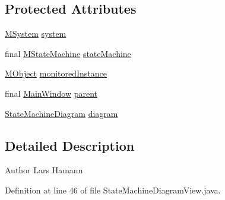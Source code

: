 \subsection*{Protected Attributes}
\begin{DoxyCompactItemize}
\item 
\hyperlink{classorg_1_1tzi_1_1use_1_1uml_1_1sys_1_1_m_system}{M\-System} \hyperlink{classorg_1_1tzi_1_1use_1_1gui_1_1views_1_1diagrams_1_1statemachine_1_1_state_machine_diagram_view_af2f54ac086a677b0a87ff42852537ef2}{system}
\item 
final \hyperlink{classorg_1_1tzi_1_1use_1_1uml_1_1mm_1_1statemachines_1_1_m_state_machine}{M\-State\-Machine} \hyperlink{classorg_1_1tzi_1_1use_1_1gui_1_1views_1_1diagrams_1_1statemachine_1_1_state_machine_diagram_view_a668c0e84505439445ae31b949dc8b727}{state\-Machine}
\item 
\hyperlink{interfaceorg_1_1tzi_1_1use_1_1uml_1_1sys_1_1_m_object}{M\-Object} \hyperlink{classorg_1_1tzi_1_1use_1_1gui_1_1views_1_1diagrams_1_1statemachine_1_1_state_machine_diagram_view_a3c6ef52773350898649b6cfd696ea16a}{monitored\-Instance}
\item 
final \hyperlink{classorg_1_1tzi_1_1use_1_1gui_1_1main_1_1_main_window}{Main\-Window} \hyperlink{classorg_1_1tzi_1_1use_1_1gui_1_1views_1_1diagrams_1_1statemachine_1_1_state_machine_diagram_view_ae9d2ebbda9e0e6cef76f2c8cc73056b7}{parent}
\item 
\hyperlink{classorg_1_1tzi_1_1use_1_1gui_1_1views_1_1diagrams_1_1statemachine_1_1_state_machine_diagram}{State\-Machine\-Diagram} \hyperlink{classorg_1_1tzi_1_1use_1_1gui_1_1views_1_1diagrams_1_1statemachine_1_1_state_machine_diagram_view_a4484b6b918c8fd6e921bce09fdcd99bf}{diagram}
\end{DoxyCompactItemize}


\subsection{Detailed Description}
\begin{DoxyAuthor}{Author}
Lars Hamann 
\end{DoxyAuthor}


Definition at line 46 of file State\-Machine\-Diagram\-View.\-java.



